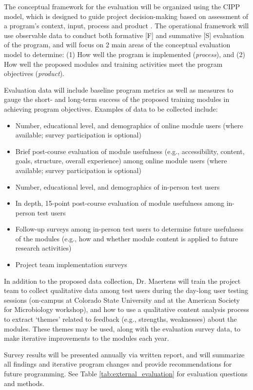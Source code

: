 \documentclass[pdftex,english,11.5pt,parskip=half]{scrartcl}
\begin{document}
The conceptual framework for the evaluation will be organized using the CIPP model, which is designed to guide project decision-making based on assessment of a program’s context, input, process and product \cite{stufflebeam2004cipp}. The operational framework will use observable data to conduct both formative [F] and summative [S] evaluation of the program, and will focus on 2 main areas of the conceptual evaluation model to determine: (1) How well the program is implemented (\textit{process}), and (2) How well the proposed modules and training activities meet the program objectives (\textit{product}).

Evaluation data will include baseline program metrics as well as measures to gauge the short- and long-term success of the proposed training modules in achieving program objectives. Examples of data to be collected include:

\begin{itemize}
\item Number, educational level, and demographics of online module users (where available; survey participation is optional)
\item Brief post-course evaluation of module usefulness (e.g., accessibility, content, goals, structure, overall experience) among online module users (where available; survey participation is optional)
\item Number, educational level, and demographics of in-person test users
\item In depth, 15-point post-course evaluation of module usefulness among in-person test users
\item Follow-up surveys among in-person test users to determine future usefulness of the modules (e.g., how and whether module content is applied to future research activities)
\item Project team implementation surveys
\end{itemize}

In addition to the proposed data collection, Dr. Maertens will train the project team to collect qualitative data among test users during the day-long user testing sessions (on-campus at Colorado State University and at the American Society for Microbiology workshop), and how to use a qualitative content analysis process to extract ‘themes’ related to feedback (e.g., strengths, weaknesses) about the modules. These themes may be used, along with the evaluation survey data, to make iterative improvements to the modules each year.

Survey results will be presented annually via written report, and will summarize all findings and iterative program changes and provide recommendations for future programming. See Table \ref*{tab:external_evaluation} for evaluation questions and methods.
\end{document}

